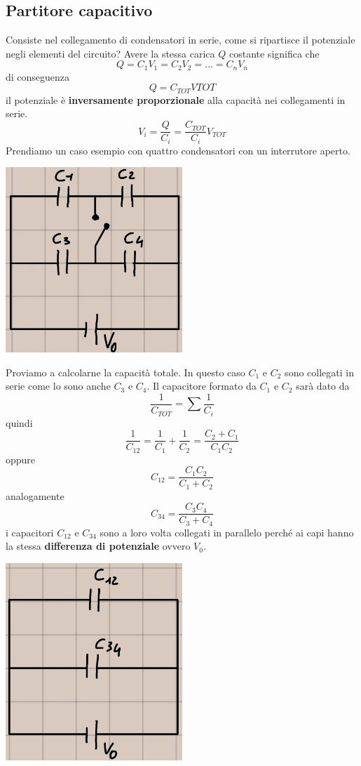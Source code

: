 \documentclass[a4paper, 12pt]{book}
\theoremstyle{plain}
\begin{document}
\subsection{Partitore capacitivo}

Consiste nel collegamento di condensatori in serie, 
come si ripartisce il potenziale negli elementi del circuito?
Avere la stessa carica $Q$ costante significa che \[ Q = 
C_1 V_1 = C_2 V_2 = \dots = C_n V_n \] di conseguenza
\[ Q = C_{TOT} V{TOT} \] il potenziale è \textbf{inversamente 
proporzionale} alla capacità nei collegamenti in serie.
\[ V_i = \frac{Q}{C_i} = \frac{C_{TOT}}{C_i} V_{TOT} \]
Prendiamo un caso esempio con quattro condensatori con 
un interrutore aperto.
\begin{center}
    \includegraphics[width=0.5\textwidth]{int_aperto.jpg}
\end{center}
Proviamo a calcolarne la capacità totale. In questo caso
$C_1$ e $C_2$ sono collegati in serie come lo sono anche 
$C_3$ e $C_4$. Il capacitore formato da $C_1$ e $C_2$ sarà 
dato da \[ \frac{1}{C_{TOT}} = \sum \frac{1}{C_i} \] 
quindi \[ \frac{1}{C_{12}} = \frac{1}{C_1} + \frac{1}{C_2} = \frac{C_2 + C_1}{C_1C_2}\] 
oppure \[ C_{12} = \frac{C_1C_2}{C_1+C_2}\]  analogamente 
\[ C_{34} = \frac{C_3C_4}{C_3+C_4}\] i capacitori 
$C_{12}$ e $C_{34}$ sono a loro volta collegati in parallelo 
perché ai capi hanno la stessa \textbf{differenza di potenziale} ovvero $V_0$.
\begin{center}
    \includegraphics[width=0.5\textwidth]{coll_parall_2.jpg}
\end{center}
\end{document}
